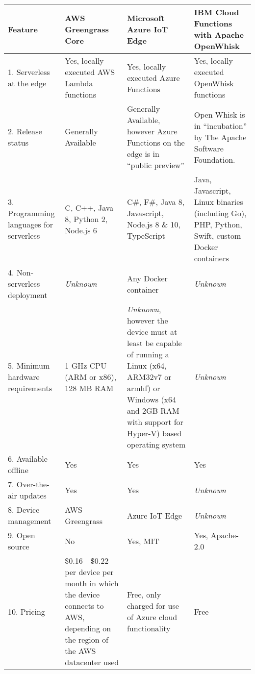 \documentclass[article]{aaltoseries}
\begin{document}
\newcommand{\unkown}{\emph{Unknown}}
\begin{landscape}
    \noindent
    \begin{tabularx}{\linewidth}{|l|X|X|X|}
    \caption{Feature comparison overview between the three edge computing solutions.}\label{tbl:feature-comparison}\\
\hline
\textbf{Feature}
        & \textbf{AWS Greengrass Core}
        & \textbf{Microsoft Azure IoT Edge}
        & \textbf{IBM Cloud Functions with Apache OpenWhisk}
        \\ \hline
1. Serverless at the edge               
        & Yes, locally executed AWS Lambda functions
        & Yes, locally executed Azure Functions
        & Yes, locally executed OpenWhisk functions
        \\ \hline
2. Release status
        & Generally Available
        & Generally Available, however Azure Functions on the edge is in ``public preview''
        & Open Whisk is in ``incubation'' by The Apache Software Foundation.
        \\ \hline
3. Programming languages for serverless 
        & C, C++, Java 8, Python 2, Node.js 6
        & C\#, F\#, Java 8, Javascript, Node.js 8 \& 10, TypeScript
        & Java, Javascript, Linux binaries (including Go), PHP, Python, Swift, custom Docker containers
        \\ \hline
4. Non-serverless deployment 
        & \unkown
        & Any Docker container
        & \unkown
        \\ \hline
5. Minimum hardware requirements
        & 1 GHz CPU (ARM or x86), 128 MB RAM
        & \unkown, however the device must at least be capable of running a Linux (x64, ARM32v7 or armhf) or Windows (x64 and 2GB RAM with support for Hyper-V) based operating system 
        & \unkown
        \\ \hline
6. Available offline
        & Yes
        & Yes
        & Yes
        \\ \hline
7. Over-the-air updates
        & Yes
        & Yes
        & \unkown
        \\ \hline
8. Device management
        & AWS Greengrass
        & Azure IoT Edge
        & \unkown
        \\ \hline
9. Open source
        & No
        & Yes, MIT
        & Yes, Apache-2.0
        \\ \hline
10. Pricing
        & \$0.16 - \$0.22 per device per month in which the device connects to AWS, depending on the region of the AWS datacenter used
        & Free, only charged for use of Azure cloud functionality
        & Free
        \\ \hline
    \end{tabularx}
\end{landscape}
\end{document}
